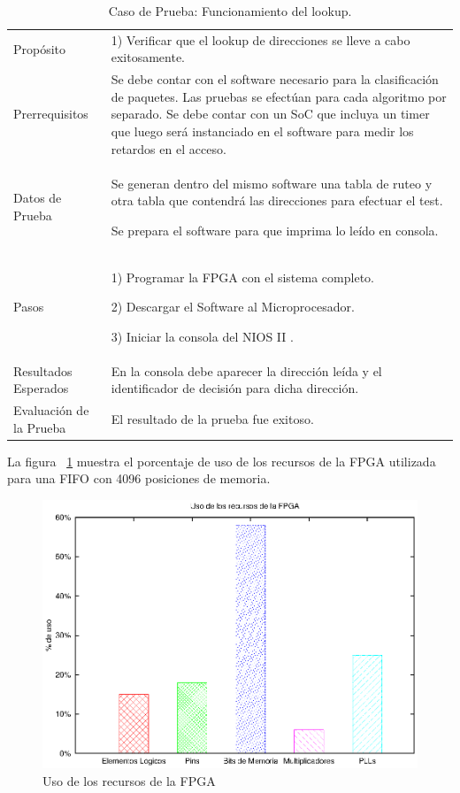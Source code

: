 \begin{table}
	\begin{tabular}{|>{\columncolor[gray]{0.8}}l|p{9cm}|} \hline
\multicolumn{2}{|>{\columncolor[gray]{0.8}}l|}{\textbf{Caso de Prueba: Funcionamiento del LookUp }}\\ \hline
Propósito  & 1) Verificar que el lookup de direcciones se lleve a cabo exitosamente. 

\\ \hline
 Prerrequisitos  & Se debe contar con el software necesario para la clasificación de paquetes. Las pruebas se efectúan para cada algoritmo por separado. Se debe contar con un SoC que incluya un timer que luego será instanciado en el software para medir los retardos en el acceso.
 \\ \hline
 Datos de Prueba & Se generan dentro del mismo software una tabla de ruteo y otra tabla que contendrá las direcciones para efectuar el test. 

Se prepara el software para que imprima lo leído en consola. 
 \\ \hline
 Pasos & 1) Programar la FPGA con el sistema completo.

2) Descargar el Software al Microprocesador. 

3) Iniciar la consola del NIOS II .
\\ \hline
 Resultados Esperados & En la consola debe aparecer la dirección leída y el identificador de decisión para dicha dirección. \\ \hline
 Evaluación de la Prueba  & El resultado de la prueba fue exitoso.\\ \hline
	\end{tabular}
	\caption{Caso de Prueba: Funcionamiento del lookup.}
	\label{tab:retlook}
\end{table}

\newpage
La figura ~\ref{fig:fpga} muestra el porcentaje de uso de los recursos de la FPGA utilizada para una FIFO con 4096 posiciones de memoria.
\begin{figure}[H]
  \centering
	\includegraphics[scale=0.70]{4-implementacion/graf/fpga.eps}
  \caption{Uso de los recursos de la FPGA}
  \label{fig:fpga}
\end{figure}

